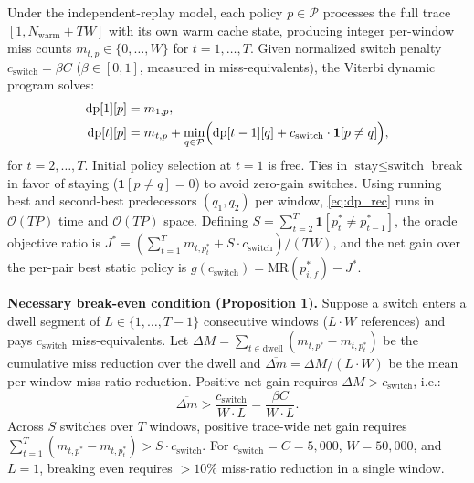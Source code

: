 \documentclass[10pt,twocolumn]{article}
\begin{document}
Under the independent-replay model, each policy $p \in \mathcal{P}$ processes the full trace $[1, N_{\text{warm}} + TW]$ with its own warm cache state, producing integer per-window miss counts $m_{t,p} \in \{0,\dots,W\}$ for $t = 1,\dots,T$. Given normalized switch penalty $c_{\text{switch}} = \beta C$ ($\beta \in [0, 1]$, measured in miss-equivalents), the Viterbi dynamic program solves:
\begin{align}
\text{dp}[1][p] &= m_{1,p}, \label{eq:dp_init}\\
\text{dp}[t][p] &= m_{t,p} + \min_{q \in \mathcal{P}} \Bigl(\text{dp}[t-1][q] + c_{\text{switch}} \cdot \mathbf{1}[p \ne q]\Bigr), \label{eq:dp_rec}
\end{align}
for $t = 2,\dots,T$. Initial policy selection at $t=1$ is free. Ties in $\text{stay} \le \text{switch}$ break in favor of staying ($\mathbf{1}[p \ne q]=0$) to avoid zero-gain switches. Using running best and second-best predecessors $(q_1, q_2)$ per window, \eqref{eq:dp_rec} runs in $\mathcal{O}(TP)$ time and $\mathcal{O}(TP)$ space. Defining $S = \sum_{t=2}^T \mathbf{1}[p_t^* \ne p_{t-1}^*]$, the oracle objective ratio is $J^* = (\sum_{t=1}^T m_{t,p_t^*} + S \cdot c_{\text{switch}}) / (TW)$, and the net gain over the per-pair best static policy is $g(c_{\text{switch}}) = \text{MR}(p_{i,f}^*) - J^*$.

\textbf{Necessary break-even condition (Proposition 1).} Suppose a switch enters a dwell segment of $L \in \{1,\dots,T-1\}$ consecutive windows ($L \cdot W$ references) and pays $c_{\text{switch}}$ miss-equivalents. Let $\Delta M = \sum_{t \in \text{dwell}} (m_{t,p^*} - m_{t,p_t^*})$ be the cumulative miss reduction over the dwell and $\overline{\Delta m} = \Delta M / (L \cdot W)$ be the mean per-window miss-ratio reduction. Positive net gain requires $\Delta M > c_{\text{switch}}$, i.e.:
\begin{equation}
\overline{\Delta m} > \frac{c_{\text{switch}}}{W \cdot L} = \frac{\beta C}{W \cdot L}. \label{eq:breakeven}
\end{equation}
Across $S$ switches over $T$ windows, positive trace-wide net gain requires $\sum_{t=1}^T (m_{t,p^*} - m_{t,p_t^*}) > S \cdot c_{\text{switch}}$. For $c_{\text{switch}} = C = 5{,}000$, $W = 50{,}000$, and $L=1$, breaking even requires $>10\%$ miss-ratio reduction in a single window.
\end{document}
